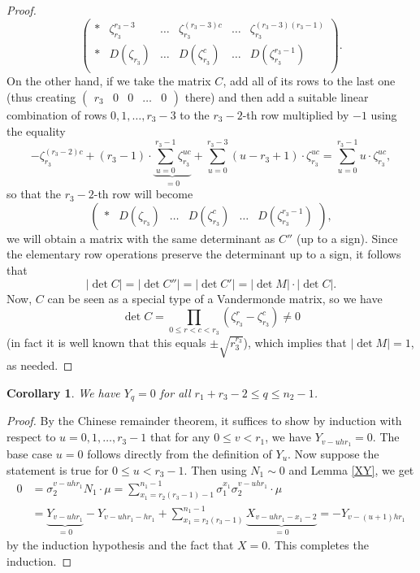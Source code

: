 \documentclass[12pt,a4paper]{article}
\newtheorem{cor}[theorem]{Corollary}
\theoremstyle{definition}
\newcommand{\zt}{\zeta_{r_3}}
\begin{document}
\begin{proof}
$$\begin{pmatrix}
*& \zt^{r_3-3}& \dots & \zt^{(r_3-3)c} & \dots & \zt^{(r_3-3)(r_3-1)}\\ 
*& D(\zt)& \dots & D(\zt^c) & \dots & D(\zt^{r_3-1})\\ 
\end{pmatrix}.
$$
On the other hand, if we take the matrix $C$, add all of its rows to the last one (thus creating $\begin{pmatrix}
r_3 & 0 & 0& \dots &0
\end{pmatrix}$
there) and then add a suitable linear combination of rows $0,1,\dots, r_3-3$ to the $r_3-2$-th row multiplied by $-1$ using the equality
$$-\zt^{(r_3-2)c}+(r_3-1)\cdot\underbrace{\sum_{u=0}^{r_3-1}\zt^{uc}}_{=0}+\sum_{u=0}^{r_3-3}(u-r_3+1)\cdot\zt^{uc}=\sum_{u=0}^{r_3-1}u\cdot\zt^{uc},$$
so that the $r_3-2$-th row will become
$$\begin{pmatrix}
*& D(\zt)& \dots & D(\zt^c) & \dots & D(\zt^{r_3-1})
\end{pmatrix},$$
we will obtain a matrix with the same determinant as $C''$ (up to a sign). Since the elementary row operations preserve the determinant up to a sign, it follows that
$$|\det C|=|\det C''|=|\det C'|=|\det M|\cdot |\det C|.$$ 
Now, $C$ can be seen as a special type of a Vandermonde matrix, so we have $$\det C=\prod_{0\leq r<c<r_3}(\zt^r-\zt^c)\neq 0$$
(in fact it is well known that this equals $\pm \sqrt{r_3^{r_3}}$), which implies that %
 $|\det M|=1$, as needed.
\end{proof}

\begin{cor}
We have $Y_q=0$ for all $r_1+r_3-2\leq q\leq n_2-1$.
\end{cor}
\begin{proof}
By the Chinese remainder theorem, it suffices to show by induction with respect to $u=0,1,\dots,r_3-1$ that for any $0\leq v<r_1$, we have $Y_{v-uhr_1}=0.$ The base case $u=0$ follows directly from the definition of $Y_u$. Now suppose the statement is true for $0\leq u<r_3-1$. Then using $N_1\sim 0$ and Lemma \ref{XY}, we get
\begin{align*}
0&=\sigma_2^{v-uhr_1} N_1 \cdot \mu=\sum_{x_1=r_2(r_3-1)-1}^{n_1-1}\sigma_1^{x_1}\sigma_2^{v-uhr_1}\cdot\mu\\
&=\underbrace{Y_{v-uhr_1}}_{=0}-Y_{v-uhr_1-hr_1}+\sum_{x_1=r_2(r_3-1)}^{n_1-1}\underbrace {X_{v-uhr_1-x_1-2}}_{=0}=-Y_{v-(u+1)hr_1}
\end{align*}
by the induction hypothesis and the fact that $X=0$. This completes the induction.
\end{proof}
\end{document}
